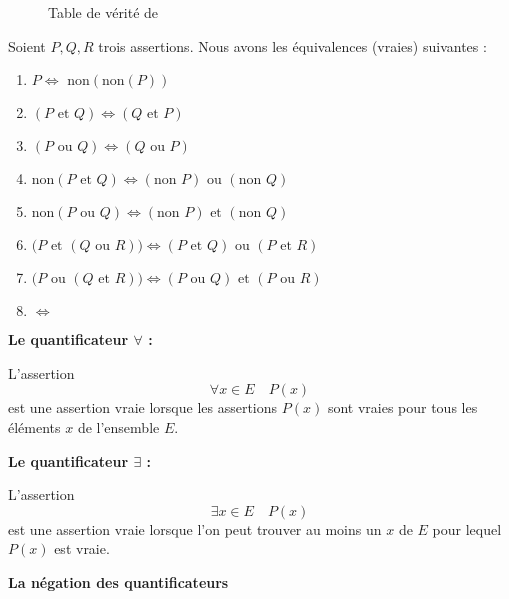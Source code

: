 \documentclass[10pt,class=article,crop=false]{standalone}
\begin{document}
\begin{multicols}{2}
\begin{figure}[H]
	{Table de vérité de }
\end{figure}


\begin{proposition}
	\label{prop:log}
	Soient $P, Q, R$ trois assertions.
	Nous avons les équivalences (vraies) suivantes :
	\begin{enumerate}
		\item \emph{$P \iff \text{ non}(\text{non}(P))$}
		\item \emph{$(P \text{ et } Q) \iff (Q \text{ et } P)$}
		\item \emph{$(P \text{ ou } Q) \iff (Q \text{ ou } P)$}
		\item \emph{$\text{non}(P \text{ et } Q)  \iff  (\text{non } P)  \text{ ou } (\text{non }Q)$}
		\item \emph{$\text{non}(P \text{ ou } Q)  \iff  (\text{non } P)  \text{ et } (\text{non }Q)$}
		\item \emph{$\big(P \text{ et } (Q \text{ ou } R)  \big)   \iff
			(P \text{ et } Q) \text{ ou } (P \text{ et }  R)$}
		\item \emph{$\big(P \text{ ou } (Q \text{ et } R)  \big)   \iff
			(P \text{ ou } Q) \text{ et } (P \text{ ou }  R)$}
		\item  {}  $\iff$ 
	\end{enumerate}
\end{proposition}



\textbf{Le quantificateur $\forall$ : }
\index{$\forall$}

L'assertion
$$\forall x \in E \quad P(x)$$
est une assertion vraie lorsque les assertions $P(x)$ sont vraies pour tous les éléments $x$
de l'ensemble $E$.


\textbf{Le quantificateur $\exists$ : }
\index{$\exists$}

L'assertion
$$\exists x \in E \quad P(x)$$
est une assertion vraie lorsque l'on peut trouver au moins un $x$ de $E$ pour lequel $P(x)$ est vraie.


\textbf{La négation des quantificateurs}


\end{multicols}
\end{document}
